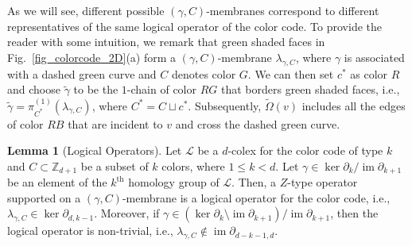 \documentclass[onecolumn,letterpaper,11pt,accepted=2022-12-19]{quantumarticle}
\DeclareMathOperator{\im}{im}
\newcommand{\bnd}[2]{\partial_{#1,#2}}
\theoremstyle{definition}
\newtheorem{lemma}{Lemma}
\theoremstyle{lemma}
\theoremstyle{theorem}
\theoremstyle{corollary}
\begin{document}
{\begin{enumerate}
As we will see, different possible $(\gamma,C)$-membranes correspond to different representatives of the same logical operator of the color code.
To provide the reader with some intuition, we remark that green shaded faces in  Fig.~\ref{fig_colorcode_2D}(a) form a $(\gamma,C)$-membrane $\lambda_{\gamma,C}$, where $\gamma$ is associated with a dashed green curve and $C$ denotes color $G$.
We can then set $c^*$ as color $R$ and choose $\widetilde\gamma$ to be the $1$-chain of color $RG$ that borders green shaded faces, i.e., $\widetilde\gamma = \pi^{(1)}_{C^*}(\lambda_{\gamma,C})$, where $C^* = C\sqcup{c^*}$.
Subsequently, $\widetilde\Omega(v)$ includes all the edges of color $RB$ that are incident to $v$ and cross the dashed green curve.
\end{enumerate}


\begin{lemma}[Logical Operators]
Let $\mathcal{L}$ be a $d$-colex for the color code of type $k$ and $C\subset\mathbb{Z}_{d+1}$ be a subset of $k$ colors, where $1\leq k < d$.
Let $\gamma\in\ker\partial_k / \im\partial_{k+1}$ be an element of the $k^{\textrm{th}}$ homology group of $\mathcal{L}$.
Then, a $Z$-type operator supported on a $(\gamma,C)$-membrane is a logical operator for the color code, i.e.,
$\lambda_{\gamma,C}\in\ker\bnd d {k-1}$.
Moreover, if $\gamma \in(\ker\partial_k\setminus\im\partial_{k+1}) / \im\partial_{k+1}$, then the logical operator is non-trivial, i.e.,
$\lambda_{\gamma,C} \not\in\im\bnd {d-k-1} d$.
\end{lemma}

}
\end{document}
